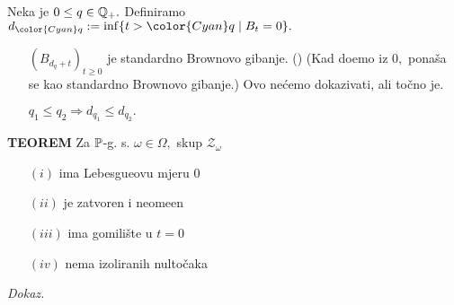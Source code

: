 \documentclass{article}
\begin{document}
Neka je \(0\le q\in\Bbb Q_+.\) Definiramo \(d_{\color{Cyan}q}:=\inf\{t>{\color{Cyan}q}\mid B_t=0\}.\)\begin{enumerate}
    \item[\ding{113}] \((B_{d_q+t})_{t\ge0}\) je standardno Brownovo gibanje. () \newline (Kad do\dj{}emo iz \(0,\) ponaša se kao standardno Brownovo gibanje.) Ovo nećemo dokazivati, ali točno je.
    \item[\ding{113}] \(q_1\le q_2\Rightarrow d_{q_1}\le d_{q_2}.\)
\end{enumerate}
\textbf{TEOREM}\newline
Za \(\Bbb P\)-g. s. \(\omega\in\Omega,\) skup \(\mathcal Z_\omega\)
\begin{enumerate}
    \item[\((i)\)] ima Lebesgueovu mjeru \(0\)
    \item[\((ii)\)] je zatvoren  i neome\dj{}en
    \item[\((iii)\)] ima gomilište u \(t=0\)
    \item[\((iv)\)] nema izoliranih nultočaka
\end{enumerate}
\textit{Dokaz.}
\end{document}
